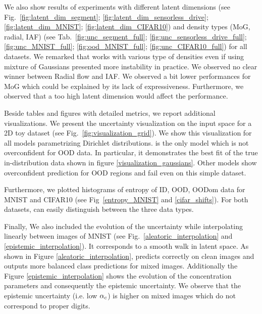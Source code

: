 We also show results of experiments with different latent dimensions (see Fig.~\ref{fig:latent_dim_segment}; \ref{fig:latent_dim_sensorless_drive}; \ref{fig:latent_dim_MNIST}; \ref{fig:latent_dim_CIFAR10}) and density types (MoG, radial, IAF) (see Tab.~\ref{fig:unc_segment_full}; \ref{fig:unc_sensorless_drive_full}; \ref{fig:unc_MNIST_full}; \ref{fig:ood_MNIST_full}; \ref{fig:unc_CIFAR10_full}) for all datasets. We remarked that \oursacro works with various type of densities even if using mixture of Gaussians presented more instability in practice. We observed no clear winner between Radial flow and IAF. We observed a bit lower performances for MoG which could be explained by its lack of expressiveness. Furthermore, we observed that a too high latent dimension would affect the performance.

Beside tables and figures with detailed metrics, we report additional visualizations. We present the uncertainty visualization on the input space for a 2D toy dataset (see Fig.~\ref{fig:visualization_grid}). We show this visualization for all models parametrizing Dirichlet distributions. \oursacro is the only model which is not overconfident for OOD data. In particular, it demonstrates the best fit of the true in-distribution data shown in figure \ref{visualization_gaussians}. Other models show overconfident prediction for OOD regions and fail even on this simple dataset. 

Furthermore, we plotted histograms of entropy of ID, OOD, OODom data for MNIST and CIFAR10 (see Fig~\ref{entropy_MNIST} and \ref{cifar_shifts}). For both datasets, \oursacro can easily distinguish between the three data types.

Finally, We also included the evolution of the uncertainty while interpolating linearly between images of MNIST (see Fig.~\ref{aleatoric_interpolation} and \ref{epistemic_interpolation}). It corresponds to a smooth walk in latent space. As shown in Figure \ref{aleatoric_interpolation}, \oursacro predicts correctly on clean images and outputs more balanced class predictions for mixed images. Additionally the Figure \ref{epistemic_interpolation} shows the evolution of the concentration parameters and consequently the epistemic uncertainty. We observe that the epistemic uncertainty (i.e. low $\alpha_c$) is higher on mixed images which do not correspond to proper digits.


